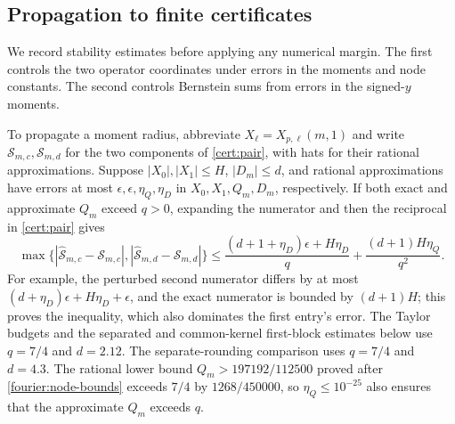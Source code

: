 \subsection{Propagation to finite certificates}\label{cert:propagation}

We record stability estimates before applying any numerical margin.
The first controls the two operator coordinates under errors in the moments
and node constants.  The second controls Bernstein sums from errors in
the signed-$y$ moments.

To propagate a moment radius, abbreviate $X_\ell=X_{p,\ell}(m,1)$ and
write $\mathcal S_{m,c},\mathcal S_{m,d}$ for the two components of
\eqref{cert:pair}, with hats for their rational approximations.
Suppose $|X_0|,|X_1|\le H$,
$|D_m|\le d$, and rational approximations have errors at most
$\epsilon,\epsilon,\eta_Q,\eta_D$ in $X_0,X_1,Q_m,D_m$, respectively.
If both exact and approximate $Q_m$ exceed $q>0$, expanding the numerator
and then the reciprocal in \eqref{cert:pair} gives
\begin{equation}\label{ind:pair-stability}
 \max\{|\widehat{\mathcal S}_{m,c}-\mathcal S_{m,c}|,
        |\widehat{\mathcal S}_{m,d}-\mathcal S_{m,d}|\}
 \le \frac{(d+1+\eta_D)\epsilon+H\eta_D}{q}
       +\frac{(d+1)H\eta_Q}{q^2}.
\end{equation}
For example, the perturbed second numerator differs by at most
$(d+\eta_D)\epsilon+H\eta_D+\epsilon$, and the exact numerator is bounded
by $(d+1)H$; this proves the inequality, which also dominates the first
entry's error.  The Taylor budgets and the separated and common-kernel
first-block estimates below use $q=7/4$ and $d=2.12$.  The separate-rounding
comparison uses $q=7/4$ and $d=4.3$.
The rational lower bound $Q_m>197192/112500$ proved after
\eqref{fourier:node-bounds} exceeds $7/4$ by $1268/450000$, so
$\eta_Q\le10^{-25}$ also ensures that the approximate $Q_m$ exceeds $q$.

